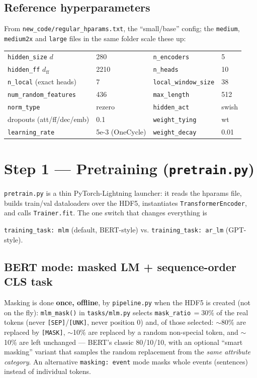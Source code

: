\documentclass[11pt,a4paper]{article}
\newcommand{\file}[1]{\texttt{\small #1}}
\newcommand{\code}[1]{\texttt{\small #1}}
\begin{document}
\subsection{Reference hyperparameters}
From \file{new\_code/regular\_hparams.txt}, the ``small/base'' config; the
\code{medium}, \code{medium2x} and \code{large} files in the same folder scale
these up:
\begin{center}\small
\begin{tabular}{@{}llll@{}}
\toprule
\code{hidden\_size} $d$ & 280 & \code{n\_encoders} & 5 \\
\code{hidden\_ff} $d_{\mathrm{ff}}$ & 2210 & \code{n\_heads} & 10 \\
\code{n\_local} (exact heads) & 7 & \code{local\_window\_size} & 38 \\
\code{num\_random\_features} & 436 & \code{max\_length} & 512 \\
\code{norm\_type} & rezero & \code{hidden\_act} & swish \\
dropouts (att/ff/dec/emb) & 0.1 & \code{weight\_tying} & wt \\
\code{learning\_rate} & 5e-3 (OneCycle) & \code{weight\_decay} & 0.01 \\
\bottomrule
\end{tabular}
\end{center}

\section{Step 1 --- Pretraining (\file{pretrain.py})}\label{sec:pretrain}

\code{pretrain.py} is a thin PyTorch-Lightning launcher: it reads the hparams
file, builds train/val dataloaders over the HDF5, instantiates
\code{TransformerEncoder}, and calls \code{Trainer.fit}. The one switch that
changes everything is
\begin{center}
\code{training\_task: mlm} \quad (default, BERT-style) \qquad vs. \qquad
\code{training\_task: ar\_lm} \quad (GPT-style).
\end{center}

\subsection{BERT mode: masked LM + sequence-order CLS task}\label{sec:mlm}
Masking is done \textbf{once, offline}, by \file{pipeline.py} when the HDF5 is
created (not on the fly): \code{mlm\_mask()} in \file{tasks/mlm.py} selects
\code{mask\_ratio}$\,=30\%$ of the real tokens (never \code{[SEP]}/\code{[UNK]},
never position 0) and, of those selected:
$\sim$80\% are replaced by \code{[MASK]}, $\sim$10\% are replaced by a random
non-special token, and $\sim$10\% are left unchanged --- BERT's classic 80/10/10,
with an optional ``smart masking'' variant that samples the random replacement
from the \emph{same attribute category}. An alternative \code{masking: event}
mode masks whole events (sentences) instead of individual tokens.
\end{document}
